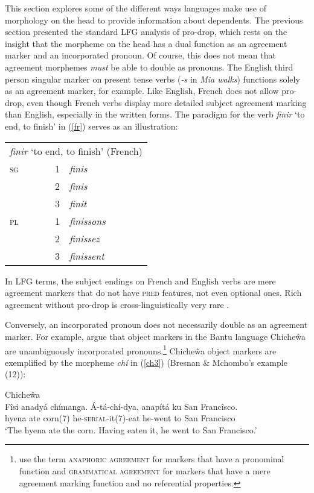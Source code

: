\documentclass[output=paper,hidelinks]{langscibook}
\begin{document}
This section explores some of the different ways languages make use of morphology on the head  to  provide information about dependents. The previous section presented the  standard LFG analysis  of pro-drop, which  rests  on the insight that  the  morpheme  on the head has a dual function  as an agreement  marker and an incorporated pronoun.   Of course, this  does not mean  that agreement morphemes \textit{must} be able  to double  as  pronouns.   The English third  person singular marker on present  tense verbs (\textit{-s} in  \textit{Mia walks}) functions solely as  an  agreement  marker, for example.   Like  English, French does  not         allow pro-drop, even though French verbs display more detailed   subject  agreement marking  than  English, especially in the written forms.   The paradigm for the verb \textit{finir}  `to end, to finish'  in  (\ref{fr}) serves as an illustration:

\ea\label{fr}\begin{tabularx}{13.5em}[t]{lrl}
  \multicolumn{3}{c}{\textit{finir}  `to end,  to finish' (French)} \\
\textsc{sg}  & 1  & \textit{finis} \\
& 2  &  \textit{finis} \\
& 3  &  \textit{finit} \\
\textsc{pl}  & 1  & \textit{finissons} \\
& 2   & \textit{finissez} \\
&  3  &  \textit{finissent}  \\   \end{tabularx}
\z
In  LFG terms, the subject    endings on French  and English  verbs   are mere   agreement  markers  that do not  have \textsc{pred} features, not  even  optional  ones.  Rich agreement without pro-drop is cross-linguistically very rare \citep{siewierska99}.

Conversely,  an incorporated pronoun does  not  necessarily double as an agreement  marker.  For  example, \citet{BM87}  argue   that object  markers in the Bantu language   Chiche\^{w}a  are   unambiguously incorporated pronouns.\footnote{\citet{BM87}  use the term \textsc{anaphoric agreement}  for markers that have a pronominal function and  \textsc{grammatical agreement} for markers that have a mere agreement marking function and no  referential properties.} Chiche\^{w}a  object markers are  exemplified by   the morpheme  \textit{chí}  in (\ref{ch3}) (Bresnan \& Mchombo's example (12)):


\ea \label{ch3}Chiche\^wa\\ \gll Fîsi  anadyá  chímanga.  Á-tá-chí-dya,
anapítá ku San  Francîsco.  \\
hyena  ate corn(7) he-\textsc{serial}-it(7)-eat he-went to San Francisco   \\
\glt `The  hyena ate the  corn. Having  eaten it, he  went  to  San Francisco.'
\z
\end{document}
